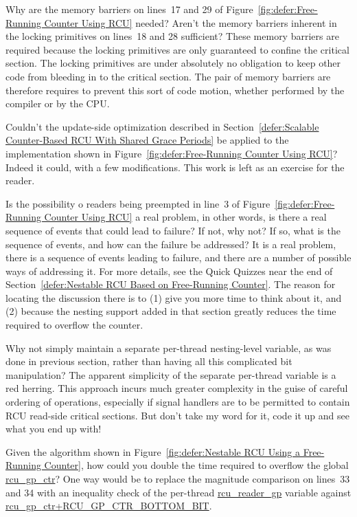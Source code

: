 \QuickQ{}
	Why are the memory barriers on lines~17 and 29 of
	Figure~\ref{fig:defer:Free-Running Counter Using RCU}
	needed?
	Aren't the memory barriers inherent in the locking
	primitives on lines~18 and 28 sufficient?
\QuickA{}
	These memory barriers are required because the locking
	primitives are only guaranteed to confine the critical
	section.
	The locking primitives are under absolutely no obligation
	to keep other code from bleeding in to the critical section.
	The pair of memory barriers are therefore requires to prevent
	this sort of code motion, whether performed by the compiler
	or by the CPU.

\QuickQ{}
	Couldn't the update-side optimization described in
	Section~\ref{defer:Scalable Counter-Based RCU With Shared Grace Periods}
	be applied to the implementation shown in
	Figure~\ref{fig:defer:Free-Running Counter Using RCU}?
\QuickA{}
	Indeed it could, with a few modifications.
	This work is left as an exercise for the reader.

\QuickQ{}
	Is the possibility o readers being preempted in
	line~3 of Figure~\ref{fig:defer:Free-Running Counter Using RCU}
	a real problem, in other words, is there a real sequence
	of events that could lead to failure?
	If not, why not?
	If so, what is the sequence of events, and how can the
	failure be addressed?
\QuickA{}
	It is a real problem, there is a sequence of events leading to
	failure, and there are a number of possible ways of
	addressing it.
	For more details, see the Quick Quizzes near the end of
	Section~\ref{defer:Nestable RCU Based on Free-Running Counter}.
	The reason for locating the discussion there is to (1) give you
	more time to think about it, and (2) because the nesting support
	added in that section greatly reduces the time required to
	overflow the counter.

\QuickQ{}
	Why not simply maintain a separate per-thread nesting-level
	variable, as was done in previous section, rather than having
	all this complicated bit manipulation?
\QuickA{}
	The apparent simplicity of the separate per-thread variable
	is a red herring.
	This approach incurs much greater complexity in the guise
	of careful ordering of operations, especially if signal
	handlers are to be permitted to contain RCU read-side
	critical sections.
	But don't take my word for it, code it up and see what you
	end up with!

\QuickQ{}
	Given the algorithm shown in
	Figure~\ref{fig:defer:Nestable RCU Using a Free-Running Counter},
	how could you double the time required to overflow the global
	\url{rcu_gp_ctr}?
\QuickA{}
	One way would be to replace the magnitude comparison on
	lines~33 and 34 with an inequality check of the per-thread
	\url{rcu_reader_gp} variable against
	\url{rcu_gp_ctr+RCU_GP_CTR_BOTTOM_BIT}.

